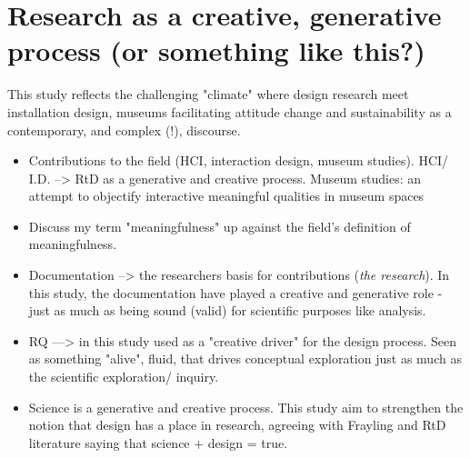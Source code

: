 \section{Research as a creative, generative process (or something like this?)}
This study reflects the challenging "climate" where design research meet installation design, museums facilitating attitude change and sustainability as a contemporary, and complex (!), discourse.

\begin{itemize}
    \item Contributions to the field (HCI, interaction design, museum studies). HCI/ I.D. --> RtD as a generative and creative process. Museum studies: an attempt to objectify interactive meaningful qualities in museum spaces
    \item Discuss my term "meaningfulness" up against the field's definition of meaningfulness. 
    
    \item Documentation --> the researchers basis for contributions (\emph{the research}). In this study, the documentation have played a creative and generative role - just as much as being sound (valid) for scientific purposes like analysis. 
    \item RQ ---> in this study used as a "creative driver" for the design process. Seen as something "alive", fluid, that drives conceptual exploration just as much as the scientific exploration/ inquiry.
    \item Science is a generative and creative process. This study aim to strengthen the notion that design has a place in research, agreeing with Frayling and RtD literature saying that science + design = true. 

\end{itemize}


